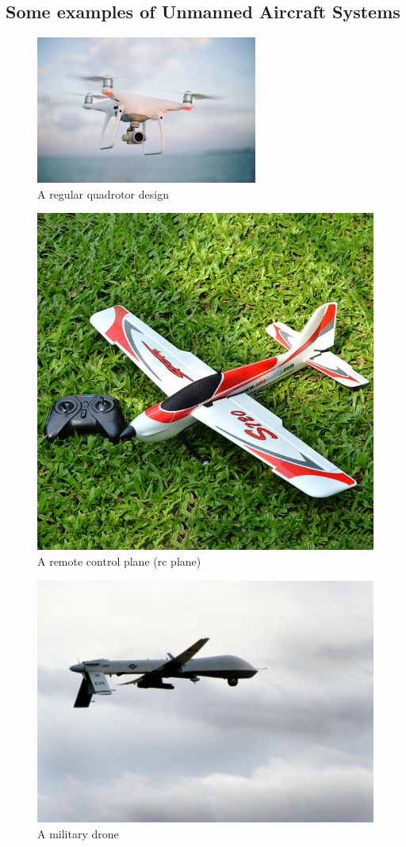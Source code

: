 \documentclass[
]{book}
\theoremstyle{definition}
\theoremstyle{definition}
\theoremstyle{definition}
\theoremstyle{definition}
\theoremstyle{remark}
\begin{document}
\hypertarget{some-examples-of-unmanned-aircraft-systems}{%
\subsection{Some examples of Unmanned Aircraft Systems}\label{some-examples-of-unmanned-aircraft-systems}}

\begin{figure}

{\centering \includegraphics[width=0.5\linewidth]{images/general/quadrotor} 

}

\caption{A regular quadrotor design}\label{fig:quad}
\end{figure}

\begin{figure}

{\centering \includegraphics[width=0.5\linewidth]{images/general/rc_plane} 

}

\caption{A remote control plane (rc plane)}\label{fig:rcplane}
\end{figure}

\begin{figure}

{\centering \includegraphics[width=0.5\linewidth]{images/general/military_drone} 

}

\caption{A military drone}\label{fig:militarydrone}
\end{figure}
\end{document}
